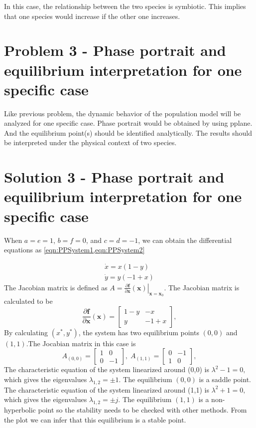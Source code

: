 \documentclass[a4paper,twocolumn]{article} %
\begin{document}
In this case, the relationship between the two species is symbiotic. This implies that one species would increase if the other one increases. 

\section{Problem 3 - Phase portrait and equilibrium interpretation for one specific case}
\label{sec:prob3} 
Like previous problem, the dynamic behavior of the population model will be analyzed for one specific case. Phase portrait would be obtained by using pplane. And the equilibrium point(s) should be identified analytically. The results should be interpreted under the physical context of two species. 


\section{Solution 3 - Phase portrait and equilibrium interpretation for one specific case}
\label{sec:solu3}
When 
$a=e=1$, $b=f=0$, and $c=d=-1$,
  we can obtain the differential equations as \cref{eqn:PPSystem1,eqn:PPSystem2}\par 
\begin{subequations}\label{eqn:PPSystem}
\begin{align}
    \dot{x} = x(1-y) \label{eqn:PPSystem1} \\
    \dot{y} = y(-1+x) \label{eqn:PPSystem2}
\end{align}
\end{subequations}
The Jacobian matrix is defined as $A = \left. \frac{\partial\textbf{f}}{\partial \textbf{x}}(\textbf{x}) \right|_{\textbf{x}=\textbf{x}_0}$. The Jacobian matrix is calculated to be
\begin{equation*}
    \frac{\partial\textbf{f}}{\partial \textbf{x}}(\textbf{x}) =
    \left[\begin{array}{cc}
    1-y & -x \\
    y & -1+x
    \end{array}\right],
\end{equation*}
By calculating $(x^*,y^*)$, the system has two equilibrium points $(0,0)$ and $(1,1)$.The Jocabian matrix in this case is
\begin{equation*}
    A_{(0,0)} =
    \left[\begin{array}{cc}
    1 & 0 \\
    0 & -1
    \end{array}\right], \; A_{(1,1)} =
    \left[\begin{array}{cc}
    0 & -1 \\
    1 & 0
    \end{array}\right],   
    \end{equation*}
 The characteristic equation of the system linearized around \mbox{(0,0)} is
$\lambda^2 -1 = 0,$ which gives the eigenvalues $\lambda_{1,2} = \pm 1$. The equilibrium $(0,0)$ is a saddle point. 
The characteristic equation of the system linearized around \mbox{(1,1)} is
$\lambda^2 +1 = 0,$ which gives the eigenvalues $\lambda_{1,2} = \pm j$. The equilibrium $(1,1)$ is a non-hyperbolic point so the stability needs to be checked with other methods. From the plot we can infer that this equilibrium is a stable point.    
\end{document}
